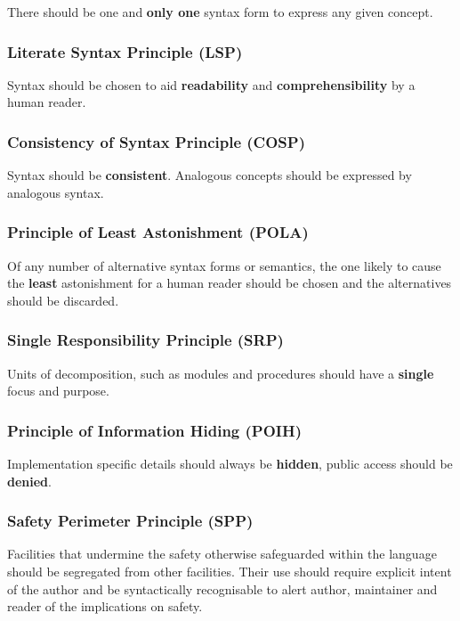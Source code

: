 \documentclass[10pt,a4paper]{article}
\begin{document}
There should be one and \textbf{only one} syntax form to express any given concept.

\subsubsection{Literate Syntax Principle (LSP)}

Syntax should be chosen to aid \textbf{readability} and \textbf{comprehensibility}
by a human reader.

\subsubsection{Consistency of Syntax Principle (COSP)}

Syntax should be \textbf{consistent}. Analogous concepts should be expressed by
analogous syntax.

\subsubsection{Principle of Least Astonishment (POLA)}

Of any number of alternative syntax forms or semantics, the one likely to cause
the \textbf{least} astonishment for a human reader should be chosen and the
alternatives should be discarded.

\subsubsection{Single Responsibility Principle (SRP)}

Units of decomposition, such as modules and procedures should have a
\textbf{single} focus and purpose.

\subsubsection{Principle of Information Hiding (POIH)}

Implementation specific details should always be \textbf{hidden}, public access
should be \textbf{denied}.

\subsubsection{Safety Perimeter Principle (SPP)}

Facilities that undermine the safety otherwise safeguarded within the language
should be segregated from other facilities. Their use should require explicit
intent of the author and be syntactically recognisable to alert author,
maintainer and reader of the implications on safety.
\end{document}
